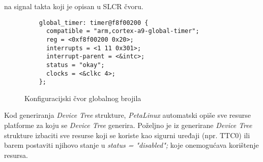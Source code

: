 \documentclass[times, utf8, diplomski, numeric]{fer}
\begin{document}
na signal takta koji je opisan u SLCR čvoru.
\begin{figure}[H]
  \lstset{xleftmargin=.1\textwidth}
  \begin{lstlisting}
    global_timer: timer@f8f00200 {
      compatible = "arm,cortex-a9-global-timer";
      reg = <0xf8f00200 0x20>;
      interrupts = <1 11 0x301>;
      interrupt-parent = <&intc>;
      status = "okay";
      clocks = <&clkc 4>;
    };
  \end{lstlisting}
  \caption{Konfiguracijski čvor globalnog brojila}
  \label{glob_timer}
\end{figure}
Kod generiranja \textit{Device Tree} strukture, \textit{PetaLinux} automatski opiše sve resurse platforme za koju se
\textit{Device Tree} generira. Poželjno je iz generirane \textit{Device Tree} strukture izbaciti sve resurse koji se koriste
kao sigurni uređaji (npr. TTC0) ili barem postaviti njihovo stanje u \textit{status = "disabled";} koje onemogućava korištenje
resursa.
\end{document}
